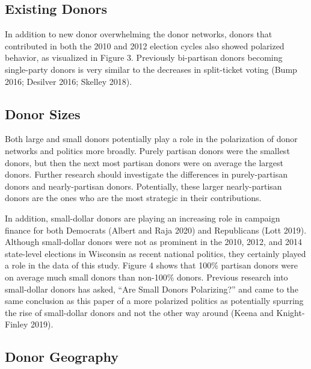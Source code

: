 \documentclass[12pt,]{article}
\begin{document}
\hypertarget{existing-donors}{%
\subsection{Existing Donors}\label{existing-donors}}

In addition to new donor overwhelming the donor networks, donors that
contributed in both the 2010 and 2012 election cycles also showed
polarized behavior, as visualized in Figure 3. Previously bi-partisan
donors becoming single-party donors is very similar to the decreases in
split-ticket voting (Bump 2016; Desilver 2016; Skelley 2018).

\hypertarget{donor-sizes}{%
\subsection{Donor Sizes}\label{donor-sizes}}

Both large and small donors potentially play a role in the polarization
of donor networks and politics more broadly. Purely partisan donors were
the smallest donors, but then the next most partisan donors were on
average the largest donors. Further research should investigate the
differences in purely-partisan donors and nearly-partisan donors.
Potentially, these larger nearly-partisan donors are the ones who are
the most strategic in their contributions.

In addition, small-dollar donors are playing an increasing role in
campaign finance for both Democrats (Albert and Raja 2020) and
Republicans (Lott 2019). Although small-dollar donors were not as
prominent in the 2010, 2012, and 2014 state-level elections in Wisconsin
as recent national politics, they certainly played a role in the data of
this study. Figure 4 shows that 100\% partisan donors were on average
much small donors than non-100\% donors. Previous research into
small-dollar donors has asked, ``Are Small Donors Polarizing?'' and came
to the same conclusion as this paper of a more polarized politics as
potentially spurring the rise of small-dollar donors and not the other
way around (Keena and Knight-Finley 2019).

\hypertarget{donor-geography}{%
\subsection{Donor Geography}\label{donor-geography}}
\end{document}
